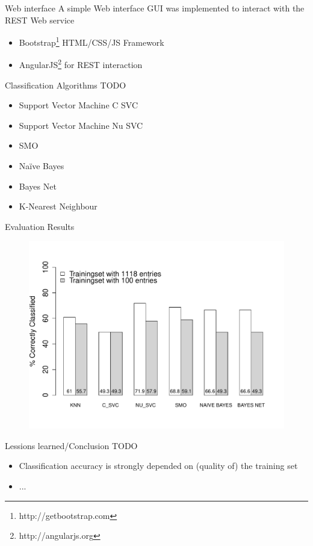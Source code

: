 \documentclass{beamer}
\begin{document}
\begin{frame}{Web interface}
A simple Web interface GUI was implemented to interact with the REST Web service
\begin{itemize}
 \item Bootstrap\footnote{http://getbootstrap.com} HTML/CSS/JS Framework
 \item AngularJS\footnote{http://angularjs.org} for REST interaction
\end{itemize}
\end{frame}

\begin{frame}{Classification Algorithms}
TODO
  \begin{itemize}
	\item Support Vector Machine C SVC
	\item Support Vector Machine Nu SVC
	\item SMO
	\item Na\"ive Bayes
	\item Bayes Net
	\item K-Nearest Neighbour
 \end{itemize}
\end{frame}

\begin{frame}{Evaluation Results}
\begin{figure}
	\includegraphics[width=1\textwidth]{evaluation}
\end{figure}
\end{frame}

\begin{frame}{Lessions learned/Conclusion}
TODO
\begin{itemize}
 \item Classification accuracy is strongly depended on (quality of) the training set
 \item ...
 \end{itemize}
\end{frame}
\end{document}
